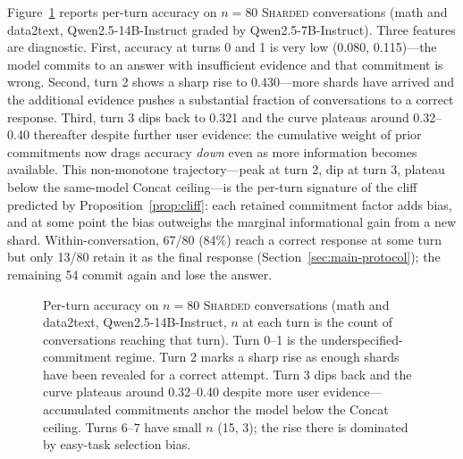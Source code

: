 \documentclass{article}
\begin{document}
Figure~\ref{fig:per-turn} reports per-turn accuracy on $n{=}80$ \textsc{Sharded} conversations (math and data2text, Qwen2.5-14B-Instruct graded by Qwen2.5-7B-Instruct). Three features are diagnostic. First, accuracy at turns 0 and 1 is very low (0.080, 0.115)---the model commits to an answer with insufficient evidence and that commitment is wrong. Second, turn 2 shows a sharp rise to 0.430---more shards have arrived and the additional evidence pushes a substantial fraction of conversations to a correct response. Third, turn 3 dips back to 0.321 and the curve plateaus around 0.32--0.40 thereafter despite further user evidence: the cumulative weight of prior commitments now drags accuracy \emph{down} even as more information becomes available. This non-monotone trajectory---peak at turn 2, dip at turn 3, plateau below the same-model Concat ceiling---is the per-turn signature of the cliff predicted by Proposition~\ref{prop:cliff}: each retained commitment factor adds bias, and at some point the bias outweighs the marginal informational gain from a new shard. Within-conversation, 67/80 (84\%) reach a correct response at some turn but only 13/80 retain it as the final response (Section~\ref{sec:main-protocol}); the remaining 54 commit again and lose the answer.

\begin{figure}[h]
\centering
{}
\caption{Per-turn accuracy on $n{=}80$ \textsc{Sharded} conversations (math and data2text, Qwen2.5-14B-Instruct, $n$ at each turn is the count of conversations reaching that turn). Turn 0--1 is the underspecified-commitment regime. Turn 2 marks a sharp rise as enough shards have been revealed for a correct attempt. Turn 3 dips back and the curve plateaus around 0.32--0.40 despite more user evidence---accumulated commitments anchor the model below the Concat ceiling. Turns 6--7 have small $n$ (15, 3); the rise there is dominated by easy-task selection bias.}
\label{fig:per-turn}
\end{figure}
\end{document}
